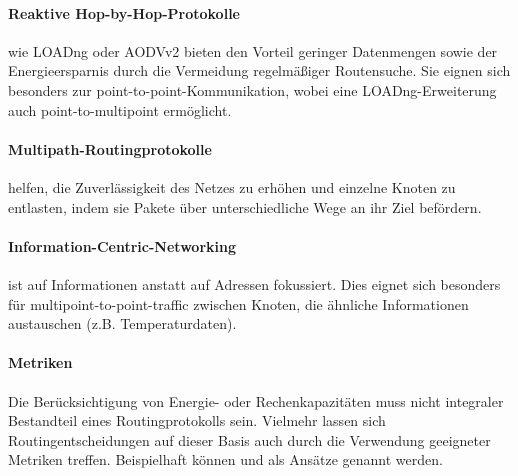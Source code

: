 \documentclass[10pt,a4paper,fleqn, twocolumn]{article}
\begin{document}

\paragraph{Reaktive Hop-by-Hop-Protokolle}
wie LOADng\cite{LOADng} oder AODVv2\cite{AODVv2} bieten den Vorteil geringer Datenmengen sowie der Energieersparnis durch die Vermeidung regelmäßiger Routensuche. Sie eignen sich besonders zur point-to-point-Kommunikation, wobei eine LOADng-Erweiterung auch point-to-multipoint ermöglicht\cite{loadng_p2mp}.



\paragraph{Multipath-Routingprotokolle} helfen, die Zuverlässigkeit des Netzes zu erhöhen und einzelne Knoten zu entlasten, indem sie Pakete über unterschiedliche Wege an ihr Ziel befördern\cite{multipath_survey}.

\paragraph{Information-Centric-Networking} ist auf Informationen anstatt auf Adressen fokussiert. Dies eignet sich besonders für multipoint-to-point-traffic zwischen Knoten, die ähnliche Informationen austauschen (z.B. Temperaturdaten)\cite{icn_survey}.


\paragraph{Metriken}
Die Berücksichtigung von Energie- oder Rechenkapazitäten muss nicht integraler Bestandteil eines Routingprotokolls sein. Vielmehr lassen sich Routingentscheidungen auf dieser Basis auch durch die Verwendung geeigneter Metriken treffen. Beispielhaft können \cite{metric_energy_delay} und \cite{Singh_power_aware_metric} als Ansätze genannt werden.

{\small


}
\end{document}
